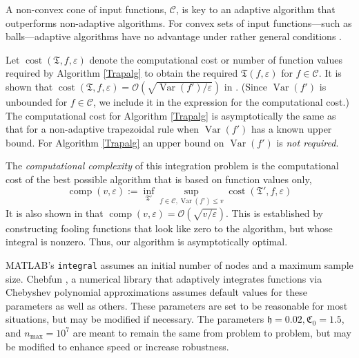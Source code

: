 \documentclass[11pt]{NSFamsart}
\DeclareMathOperator{\cost}{cost}
\DeclareMathOperator{\comp}{comp}
\newcommand{\hcut}{\mathfrak{h}}
\DeclareMathOperator{\Var}{Var}
\newcommand{\cc}{\mathcal{C}}
\newcommand{\ct}{\mathfrak{T}}
\newcommand{\fC}{\mathfrak{C}}
\newcommand{\Order}{\mathcal{O}}
\begin{document}
\begin{description}[leftmargin=2.5ex]
\vspace{-4ex}
  \noindent A non-convex cone of input functions, $\cc$, is key to an adaptive algorithm 
  that outperforms non-adaptive algorithms.  For convex sets of input functions---such as 
  balls---adaptive algorithms have no 
  advantage under rather 
  general conditions  \cite[Chap.\ 4, Corollary 5.2.1]{TraWasWoz88}.
	

	\item[Bound the computational cost of the algorithm] Let $\cost(\ct,f,\varepsilon)$ denote the 
	computational cost or number of function values  required by 
	Algorithm \ref{Trapalg} to obtain the required $\ct(f,\varepsilon)$ for $f \in \cc$.  It is shown that 
	$\cost(\ct,f,\varepsilon) = \Order (\sqrt{\Var(f')/\varepsilon})$ in \cite{HicRazYun15a}.  
	(Since $\Var(f')$ is unbounded for $f \in \cc$, we 
	include it in the expression for the computational cost.)  The computational cost for Algorithm 
	\ref{Trapalg} is asymptotically the same as that for a non-adaptive trapezoidal rule when 
	$\Var(f')$ has a known 
	upper bound.  For 
	Algorithm \ref{Trapalg} an upper bound on $\Var(f')$ is \emph{not required}.
	
	\item[Show that the adaptive algorithm is optimal] The \emph{computational complexity} of this 
	integration problem is the computational cost of the best possible algorithm that is based on 
	function values only,  
	\[
	\comp(v,\varepsilon)  := \inf_ {\ct'} \sup_{f \in \cc, \Var(f') \le v} \cost(\ct',f,\varepsilon)
	\]
	It is also shown in \cite{HicRazYun15a} that $\comp(v,\varepsilon) = \Order 
	(\sqrt{v/\varepsilon})$.  This is 
	established by constructing fooling functions that look like zero to the algorithm, but whose 
	integral is nonzero. Thus, our algorithm is asymptotically optimal.
	
	\item[The definition of adaptive algorithm includes parameters] MATLAB's 
	\texttt{integral} \cite{MAT9.3}
	assumes an initial number of nodes and a maximum sample size.  Chebfun 
	\cite{TrefEtal17a}, a 
	numerical 
	library that adaptively integrates functions via Chebyshev polynomial approximations 
	assumes 
	default values for these parameters as well as others.
	These parameters are set to be reasonable for most situations, but may be modified if 
	necessary.  The parameters  $\hcut = 0.02, \fC_0 = 
	1.5$, and 
	$n_{\max} = 10^7$ are meant to remain the same from problem to problem, but may be 
	modified 
	to 
	enhance speed or increase robustness.
	

\end{description}
\end{document}
